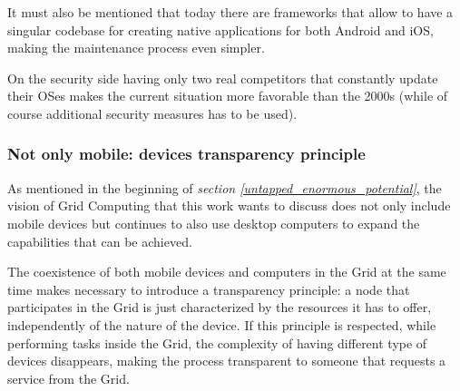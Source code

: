 It must also be mentioned that today there are frameworks that allow to have a singular codebase for creating native applications for both Android and iOS, making the maintenance process even simpler.

On the security side having only two real competitors that constantly update their OSes makes the current situation more favorable than the 2000s (while of course additional security measures has to be used).

\subsubsection{Not only mobile: devices transparency principle}
As mentioned in the beginning of \textit{section \ref{untapped_enormous_potential}}, the vision of Grid Computing that this work wants to discuss does not only include mobile devices but continues to also use desktop computers to expand the capabilities that can be achieved.

The coexistence of both mobile devices and computers in the Grid at the same time makes necessary to introduce a transparency principle: a node that participates in the Grid is just characterized by the resources it has to offer, independently of the nature of the device. If this principle is respected, while performing tasks inside the Grid, the complexity of having different type of devices disappears, making the process transparent to someone that requests a service from the Grid.
